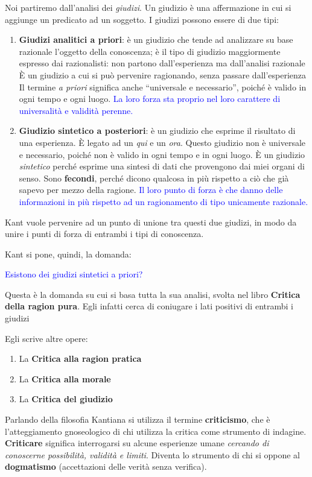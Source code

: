 \documentclass[a4paper, twoside, titlepage]{book}
\renewcommand{\emph}[1]{\textcolor{blue}{#1}}
\begin{document}
Noi partiremo dall’analisi dei \textit{giudizi}. Un giudizio è una affermazione in cui si aggiunge un predicato ad un soggetto.
I giudizi possono essere di due tipi:
\begin{enumerate}
\item \textbf{Giudizi analitici a priori}: è un giudizio che tende ad analizzare su base razionale l’oggetto della conoscenza; è il tipo di giudizio maggiormente espresso dai razionalisti: non partono dall’esperienza ma dall’analisi razionale
È un giudizio a cui si può pervenire ragionando, senza passare dall’esperienza
Il termine \textit{a priori} significa anche “universale e necessario”, poiché è valido in ogni tempo e ogni luogo.
\emph{La loro forza sta proprio nel loro carattere di universalità e validità perenne.}
\item \textbf{Giudizio sintetico a posteriori}: è un giudizio che esprime il risultato di una esperienza.  È legato ad un \textit{qui} e un \textit{ora}. Questo giudizio non è universale e necessario, poiché non è valido in ogni tempo e in ogni luogo. È un giudizio \textit{sintetico} perché esprime una sintesi di dati che provengono dai miei organi di senso. 
Sono \textbf{fecondi}, perché dicono qualcosa in più rispetto a ciò che già sapevo per mezzo della ragione.
\emph{Il loro punto di forza è che danno delle informazioni in più rispetto ad un ragionamento di tipo unicamente razionale.}
\end{enumerate}

Kant vuole pervenire ad un punto di unione tra questi due giudizi, in modo da unire i punti di forza di entrambi i tipi di conoscenza.

Kant si pone, quindi, la domanda:

\emph{Esistono dei giudizi sintetici a priori?}

Questa è la domanda su cui si basa tutta la sua analisi, svolta nel libro \textbf{Critica della ragion pura}.
Egli infatti cerca di coniugare i lati positivi di entrambi i giudizi

Egli scrive altre opere:
\begin{enumerate}
\item La \textbf{Critica alla ragion pratica}
\item La \textbf{Critica alla morale}
\item La \textbf{Critica del giudizio}
\end{enumerate}

Parlando della filosofia Kantiana si utilizza il termine \textbf{criticismo}, che è l’atteggiamento gnoseologico di chi utilizza la critica come strumento di indagine.
\textbf{Criticare} significa interrogarsi su alcune esperienze umane \textit{cercando di conoscerne possibilità, validità e limiti}. Diventa lo strumento di chi si oppone al \textbf{dogmatismo} (accettazioni delle verità senza verifica).
\end{document}
